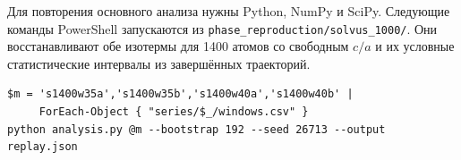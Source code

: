 Для повторения основного анализа нужны Python, NumPy и SciPy. Следующие
команды PowerShell запускаются из \nolinkurl{phase_reproduction/solvus_1000/}.
Они восстанавливают обе изотермы для 1400 атомов со свободным \(c/a\) и
их условные статистические интервалы из завершённых траекторий.
{\small
\begin{verbatim}
$m = 's1400w35a','s1400w35b','s1400w40a','s1400w40b' |
     ForEach-Object { "series/$_/windows.csv" }
python analysis.py @m --bootstrap 192 --seed 26713 --output replay.json
\end{verbatim}
}
